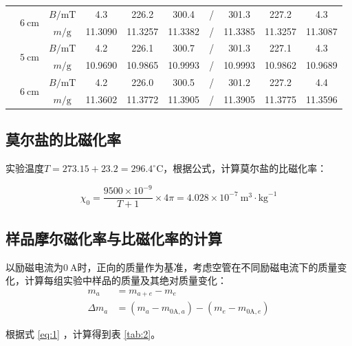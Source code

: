 \documentclass[cn,hazy,pku,12pt,normal,math=newtx,cite=super]{elegantnote}
\begin{document}
\begin{table}[H]
\begin{tabular}{cccccccccc}
\cline{2-10}
& \multirow{2}{*}{$6 \mathrm{~cm}$} & $B / \mathrm{mT}$ & 4.3 & 226.2 & 300.4  & / & 301.3 & 227.2 & 4.3 \\
& & $m/ \mathrm{g}$ & 11.3090 & 11.3257 & 11.3382  & / & 11.3385 & 11.3257 & 11.3087 \\
\cline{2-10}
& \multirow{2}{*}{$5 \mathrm{~cm}$} & $B / \mathrm{mT}$ & 4.2 & 226.1 & 300.7  & / & 301.3 & 227.1 & 4.3 \\
& & $m/ \mathrm{g}$ & 10.9690 & 10.9865 & 10.9993  & / & 10.9993 & 10.9862 & 10.9689 \\
\cline{2-10}
& \multirow{2}{*}{$6 \mathrm{~cm}$} & $B / \mathrm{mT}$ & 4.2 & 226.0 & 300.5  & / & 301.2 & 227.2 & 4.4 \\
& & $m/ \mathrm{g}$ & 11.3602 & 11.3772 & 11.3905  & / & 11.3905 & 11.3775 & 11.3596 \\

\bottomrule
\end{tabular}
\label{tab:1}
\end{table}

\subsection{莫尔盐的比磁化率}

实验温度$T = 273.15 + 23.2 = 296.4^\circ\mathrm{C}$，根据公式，计算莫尔盐的比磁化率：

\begin{equation*}
    \chi_0=\frac{9500 \times 10^{-9}}{T+1} \times 4 \pi=4.028 \times 10^{-7} \mathrm{~m}^3 \cdot \mathrm{kg}^{-1}
\end{equation*}

\subsection{样品摩尔磁化率与比磁化率的计算}

以励磁电流为$0\mathrm{~A}$时，正向的质量作为基准，考虑空管在不同励磁电流下的质量变化，计算每组实验中样品的质量及其绝对质量变化：
\begin{equation}\label{eq:1}
    \begin{aligned}
        m_a &= m_{a+e} - m_e \\
        \Delta m_a &= (m_a - m_{0\mathrm{A},a}) - (m_e - m_{0\mathrm{A},e})
    \end{aligned}
\end{equation}

根据式 \eqref{eq:1} ，计算得到表 \ref{tab:2}。 
\end{document}
